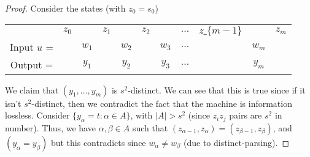 \begin{proof}
Consider the states (with $z_0 = s_0$)
\begin{table}[H]
\centering
\begin{tabular}{ccccccccccc}
            & $z_0$ &       & $z_1$ &       & $z_2$ &       & $\dots$ & $z\_\{m-1\}$ &       & $z_m$ \\
Input $u$ = &       & $w_1$ &       & $w_2$ &       & $w_3$ & $\dots$ &              & $w_m$ &       \\
Output =    &       & $y_1$ &       & $y_2$ &       & $y_3$ & $\dots$ &              & $y_m$ &      
\end{tabular}
\end{table}
\noindent We claim that $(y_1, \dots, y_m)$ is $s^2$-distinct. We can see that this is true since if it isn't $s^2$-distinct, then we contradict the fact that the machine is information lossless. Consider $\{y_\alpha = t: \alpha \in A\}$, with $|A| > s^2$ (since $z_iz_j$ pairs are $s^2$ in number). Thus, we have $\alpha, \beta \in A$ such that $(z_{\alpha-1}, z_\alpha) = (z_{\beta-1}, z_\beta)$, and $(y_\alpha = y_\beta)$ but this contradicts since $w_\alpha\neq w_\beta$ (due to distinct-parsing).
\end{proof}

